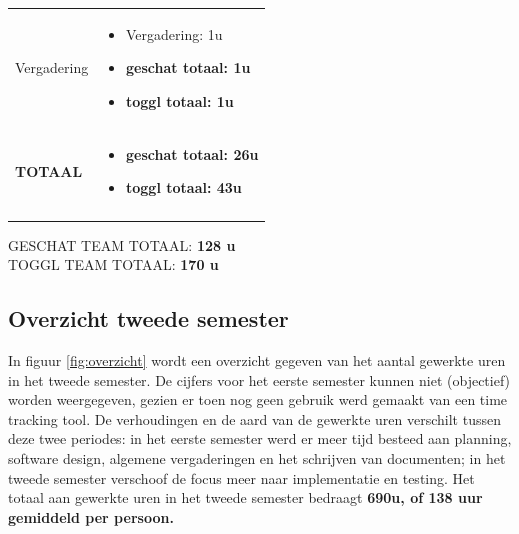 \documentclass{article}
\begin{document}
\begin{center}
\begin{tabularx}{\textwidth}[t]{XX}
\arrayrulecolor{black}\hline

\vspace{2 mm}
Vergadering & 
\begin{minipage}[t]{\linewidth}%
\vspace{2 mm}
\begin{itemize}
\item Vergadering: 1u
\item \textbf{geschat totaal: 1u}
\item \textbf{toggl totaal: 1u}
\vspace{2 mm}
\end{itemize} 
\end{minipage}\\

\arrayrulecolor{black}\hline

\vspace{2 mm}
\textbf{TOTAAL} & 
\begin{minipage}[t]{\linewidth}%
\vspace{2 mm}
\begin{itemize}
\item \textbf{geschat totaal: 26u}
\item \textbf{toggl totaal: 43u}
\vspace{2 mm}
\end{itemize} 
\end{minipage}\\

\arrayrulecolor{black}\hline

\end{tabularx}
\end{center}

\vspace{4 mm}
\noindent \large{GESCHAT TEAM TOTAAL: \textbf{128 u}}\\
\large{TOGGL TEAM TOTAAL:  \textbf{170 u}}\\



\subsection{Overzicht tweede semester}

In figuur \ref{fig:overzicht} wordt een overzicht gegeven van het aantal gewerkte uren in het tweede semester. De cijfers voor het eerste semester kunnen niet (objectief) worden weergegeven, gezien er toen nog geen gebruik werd gemaakt van een time tracking tool. De verhoudingen en de aard van de gewerkte uren verschilt tussen deze twee periodes: in het eerste semester werd er meer tijd besteed aan planning, software design, algemene vergaderingen en het schrijven van documenten; in het tweede semester verschoof de focus meer naar implementatie en testing. Het totaal aan gewerkte uren in het tweede semester bedraagt \bf{690u}, of \bf{138} uur gemiddeld per persoon. 
\end{document}
